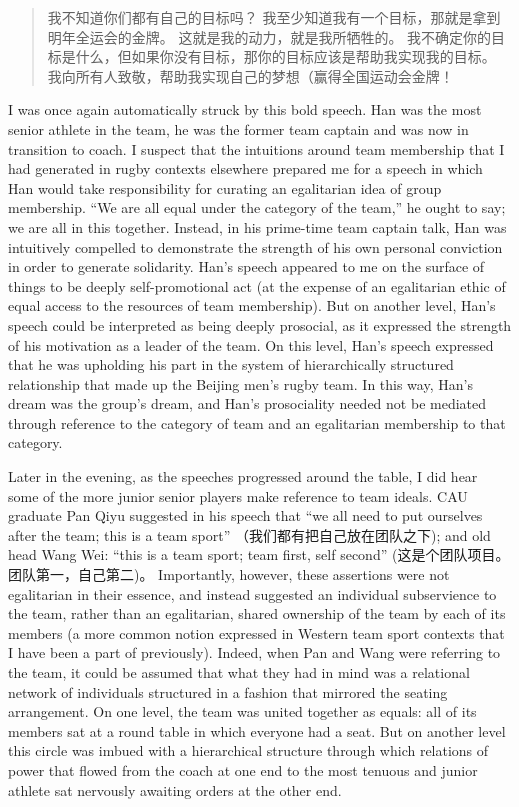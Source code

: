 \begin{CJK}{UTF8}{gbsn}
    \begin{quotation}
        我不知道你们都有自己的目标吗？ 我至少知道我有一个目标，那就是拿到明年全运会的金牌。 这就是我的动力，就是我所牺牲的。 我不确定你的目标是什么，但如果你没有目标，那你的目标应该是帮助我实现我的目标。 我向所有人致敬，帮助我实现自己的梦想（赢得全国运动会金牌！
    \end{quotation}


  I was once again automatically struck by this bold speech.  Han was the most senior athlete in the team, he was the former team captain and was now in transition to coach.  I suspect that the intuitions around team membership that I had generated in rugby contexts elsewhere prepared me for a speech in which Han would take responsibility for curating an egalitarian idea of group membership.  ``We are all equal under the category of the team,'' he ought to say; we are all in this together.   Instead, in his prime-time team captain talk, Han was intuitively compelled to demonstrate the strength of his own personal conviction in order to generate solidarity. Han's speech appeared to me on the surface of things to be deeply self-promotional act (at the expense of an egalitarian ethic of equal access to the resources of team membership). But on another level, Han's speech could be interpreted as being deeply prosocial, as it expressed the strength of his motivation as a leader of the team. On this level, Han's speech expressed that he was upholding his part in the system of hierarchically structured relationship that made up the Beijing men's rugby team.  In this way, Han's dream was the group's dream, and Han's prosociality needed not be mediated through reference to the category of team and an egalitarian membership to that category.

  Later in the evening, as the speeches progressed around the table, I did hear some of the more junior senior players make reference to team ideals.   CAU graduate Pan Qiyu suggested in his speech that ``we all need to put ourselves after the team; this is a team sport'' （我们都有把自己放在团队之下); and old head Wang Wei: ``this is a team sport; team first, self second'' (这是个团队项目。团队第一，自己第二)。 Importantly, however, these assertions were not egalitarian in their essence, and instead suggested an individual subservience to the team, rather than an egalitarian, shared ownership of the team by each of its members (a more common notion expressed in Western team sport contexts that I have been a part of previously).  Indeed, when Pan and Wang were referring to the team, it could be assumed that what they had in mind was a relational network of individuals structured in a fashion that mirrored the seating arrangement. On one level, the team was united together as equals: all of its members sat at a round table in which everyone had a seat. But on another level this circle was imbued with a hierarchical structure through which relations of power that flowed from the coach at one end to the most tenuous and junior athlete sat nervously awaiting orders at the other end.


\end{CJK}
